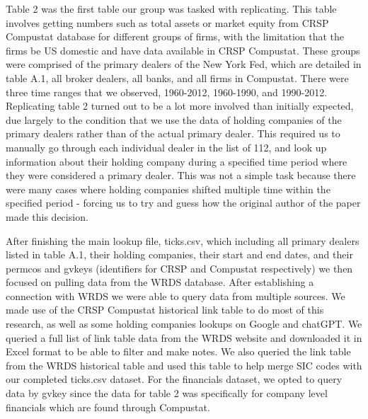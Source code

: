 \documentclass{article}
\begin{document}
Table 2 was the first table our group was tasked with replicating. This table involves getting numbers such as total assets or market equity from CRSP Compustat database for different groups of firms, with the limitation that the firms be US domestic and have data available in CRSP Compustat. These groups were comprised of the primary dealers of the New York Fed, which are detailed in table A.1, all broker dealers, all banks, and all firms in Compustat. There were three time ranges that we observed, 1960-2012, 1960-1990, and 1990-2012. Replicating table 2 turned out to be a lot more involved than initially expected, due largely to the condition that we use the data of holding companies of the primary dealers rather than of the actual primary dealer. This required us to manually go through each individual dealer in the list of 112, and look up information about their holding company during a specified time period where they were considered a primary dealer. This was not a simple task because there were many cases where holding companies shifted multiple time within the specified period - forcing us to try and guess how the original author of the paper made this decision.

After finishing the main lookup file, ticks.csv, which including all primary dealers listed in table A.1, their holding companies, their start and end dates, and their permcos and gvkeys (identifiers for CRSP and Compustat respectively) we then focused on pulling data from the WRDS database. After establishing a connection with WRDS we were able to query data from multiple sources. We made use of the CRSP Compustat historical link table to do most of this research, as well as some holding companies lookups on Google and chatGPT. We queried a full list of link table data from the WRDS website and downloaded it in Excel format to be able to filter and make notes. We also queried the link table from the WRDS historical table and used this table to help merge SIC codes with our completed ticks.csv dataset. For the financials dataset, we opted to query data by gvkey since the data for table 2 was specifically for company level financials which are found through Compustat.
\end{document}
